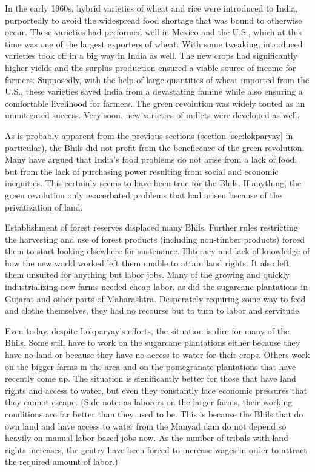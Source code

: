 \documentclass[report.tex]{subfiles}
\begin{document}
In the early 1960s, hybrid varieties of wheat and rice were introduced to India, purportedly to avoid the widespread food shortage that was bound to otherwise occur. These varieties had performed well in Mexico and the U.S., which at this time was one of the largest exporters of wheat. With some tweaking, introduced varieties took off in a big way in India as well. The new crops had significantly higher yields and the surplus production ensured a viable source of income for farmers. Supposedly, with the help of large quantities of wheat imported from the U.S., these varieties saved India from a devastating famine while also ensuring a comfortable livelihood for farmers. The green revolution was widely touted as an unmitigated success. Very soon, new varieties of millets were developed as well.

As is probably apparent from the previous sections (section \ref{sec:lokparyay} in particular), the Bhils did not profit from the beneficence of the green revolution. Many have argued that India's food problems do not arise from a lack of food, but from the lack of purchasing power resulting from social and economic inequities. This certainly seems to have been true for the Bhils. If anything, the green revolution only exacerbated problems that had arisen because of the privatization of land.

Establishment of forest reserves displaced many Bhils. Further rules restricting the harvesting and use of forest products (including non-timber products) forced them to start looking elsewhere for sustenance. Illiteracy and lack of knowledge of how the new world worked left them unable to attain land rights. It also left them unsuited for anything but labor jobs. Many of the growing and quickly industrializing new farms needed cheap labor, as did the sugarcane plantations in Gujarat and other parts of Maharashtra. Desperately requiring some way to feed and clothe themselves, they had no recourse but to turn to labor and servitude.

Even today, despite Lokparyay's efforts, the situation is dire for many of the Bhils. Some still have to work on the sugarcane plantations either because they have no land or because they have no access to water for their crops. Others work on the bigger farms in the area and on the pomegranate plantations that have recently come up. The situation is significantly better for those that have land rights and access to water, but even they constantly face economic pressures that they cannot escape. (Side note: as laborers on the larger farms, their working conditions are far better than they used to be. This is because the Bhils that do own land and have access to water from the Manyad dam do not depend so heavily on manual labor based jobs now. As the number of tribals with land rights increases, the gentry have been forced to increase wages in order to attract the required amount of labor.)
\end{document}
